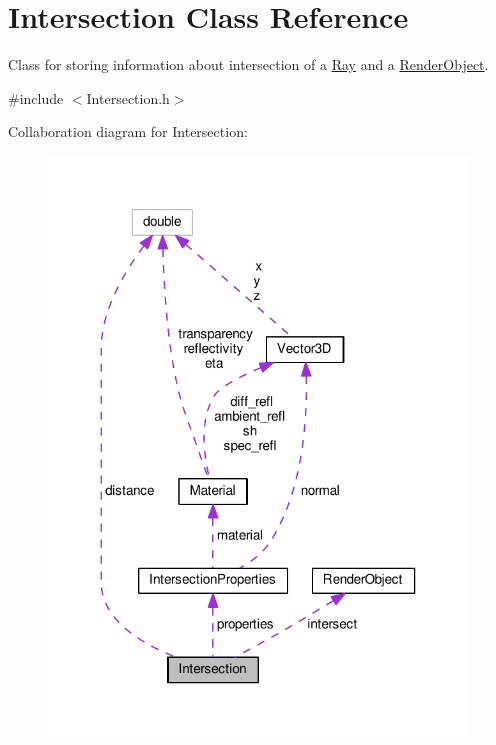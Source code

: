\hypertarget{classIntersection}{}\section{Intersection Class Reference}
\label{classIntersection}


Class for storing information about intersection of a \hyperlink{classRay}{Ray} and a \hyperlink{classRenderObject}{Render\+Object}.  




{\ttfamily \#include $<$Intersection.\+h$>$}



Collaboration diagram for Intersection\+:\nopagebreak
\begin{figure}[H]
\begin{center}
\leavevmode
\includegraphics[width=316pt]{classIntersection__coll__graph}
\end{center}
\end{figure}
